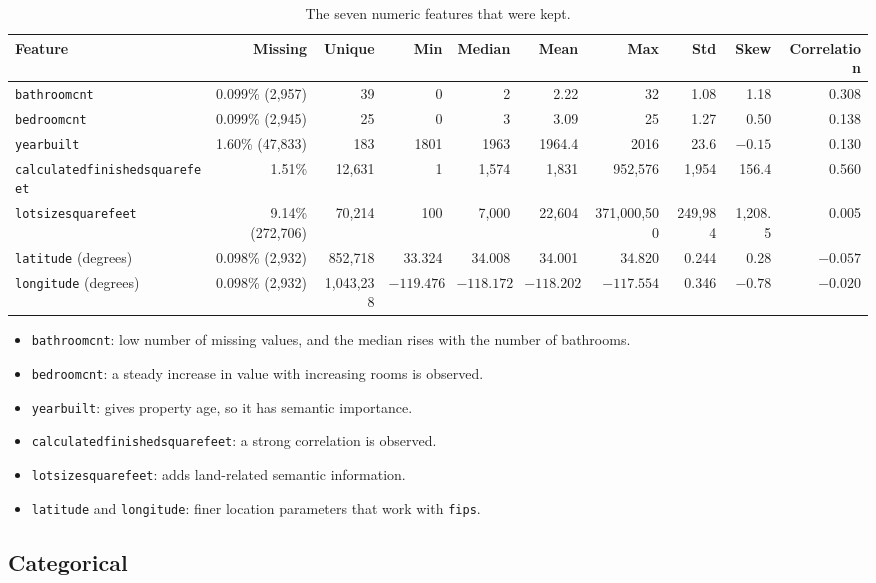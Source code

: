 \documentclass[sigconf,nonacm,10pt]{acmart}
\begin{document}
\begin{table}[t]
\caption{The seven numeric features that were kept.}
\footnotesize
\setlength{\tabcolsep}{4pt}
\begin{tabular}{@{}lrrrrrrrrr@{}}
\toprule
Feature & Missing & Unique & Min & Median & Mean & Max & Std & Skew & Correlation \\
\midrule
\texttt{bathroomcnt} & 0.099\% (2,957) & 39 & 0 & 2 & 2.22 & 32 & 1.08 & 1.18 & 0.308 \\
\texttt{bedroomcnt} & 0.099\% (2,945) & 25 & 0 & 3 & 3.09 & 25 & 1.27 & 0.50 & 0.138 \\
\texttt{yearbuilt} & 1.60\% (47,833) & 183 & 1801 & 1963 & 1964.4 & 2016 & 23.6 & $-0.15$ & 0.130 \\
\texttt{calculatedfinishedsquarefeet} & 1.51\% & 12,631 & 1 & 1,574 & 1,831 & 952,576 & 1,954 & 156.4 & 0.560 \\
\texttt{lotsizesquarefeet} & 9.14\% (272,706) & 70,214 & 100 & 7,000 & 22,604 & 371,000,500 & 249,984 & 1,208.5 & 0.005 \\
\texttt{latitude} (degrees) & 0.098\% (2,932) & 852,718 & 33.324 & 34.008 & 34.001 & 34.820 & 0.244 & 0.28 & $-0.057$ \\
\texttt{longitude} (degrees) & 0.098\% (2,932) & 1,043,238 & $-119.476$ & $-118.172$ & $-118.202$ & $-117.554$ & 0.346 & $-0.78$ & $-0.020$ \\
\bottomrule
\end{tabular}
\end{table}

\begin{itemize}
\item \texttt{bathroomcnt}: low number of missing values, and the median rises with the number of bathrooms.
\item \texttt{bedroomcnt}: a steady increase in value with increasing rooms is observed.
\item \texttt{yearbuilt}: gives property age, so it has semantic importance.
\item \texttt{calculatedfinishedsquarefeet}: a strong correlation is observed.
\item \texttt{lotsizesquarefeet}: adds land-related semantic information.
\item \texttt{latitude} and \texttt{longitude}: finer location parameters that work with \texttt{fips}.
\end{itemize}

\subsection{Categorical}
\end{document}
